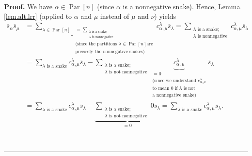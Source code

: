 \documentclass[numbers=enddot,12pt,final,onecolumn,notitlepage]{scrartcl}%
\theoremstyle{definition}
\newenvironment{proof}[1][Proof]{\noindent\textbf{#1.} }{\ \rule{0.5em}{0.5em}}
\let\sumnonlimits\sum
\renewcommand{\sum}{\sumnonlimits\limits}
\begin{document}
\begin{proof}
We have $\alpha\in\operatorname*{Par}\left[  n\right]  $ (since $\alpha$ is a
nonnegative snake). Hence, Lemma \ref{lem.alt.lrr} (applied to $\alpha$ and
$\mu$ instead of $\mu$ and $\nu$) yields%
\begin{align*}
\overline{s}_{\alpha}\overline{s}_{\mu}  &  =\underbrace{\sum_{\lambda
\in\operatorname*{Par}\left[  n\right]  }}_{\substack{=\sum_{\substack{\lambda
\text{ is a snake;}\\\lambda\text{ is nonnegative}}}\\\text{(since the
partitions }\lambda\in\operatorname*{Par}\left[  n\right]  \text{
are}\\\text{precisely the nonnegative snakes)}}}c_{\alpha,\mu}^{\lambda
}\overline{s}_{\lambda}=\sum_{\substack{\lambda\text{ is a snake;}%
\\\lambda\text{ is nonnegative}}}c_{\alpha,\mu}^{\lambda}\overline{s}%
_{\lambda}\\
&  =\sum_{\lambda\text{ is a snake}}c_{\alpha,\mu}^{\lambda}\overline
{s}_{\lambda}-\sum_{\substack{\lambda\text{ is a snake;}\\\lambda\text{ is not
nonnegative}}}\underbrace{c_{\alpha,\mu}^{\lambda}}%
_{\substack{=0\\\text{(since we understand }c_{\alpha,\mu}^{\lambda}\\\text{to
mean }0\text{ if }\lambda\text{ is not}\\\text{a nonnegative snake)}%
}}\overline{s}_{\lambda}\\
&  =\sum_{\lambda\text{ is a snake}}c_{\alpha,\mu}^{\lambda}\overline
{s}_{\lambda}-\underbrace{\sum_{\substack{\lambda\text{ is a snake;}%
\\\lambda\text{ is not nonnegative}}}0\overline{s}_{\lambda}}_{=0}%
=\sum_{\lambda\text{ is a snake}}c_{\alpha,\mu}^{\lambda}\overline{s}%
_{\lambda}.
\end{align*}



\end{proof}
\end{document}
